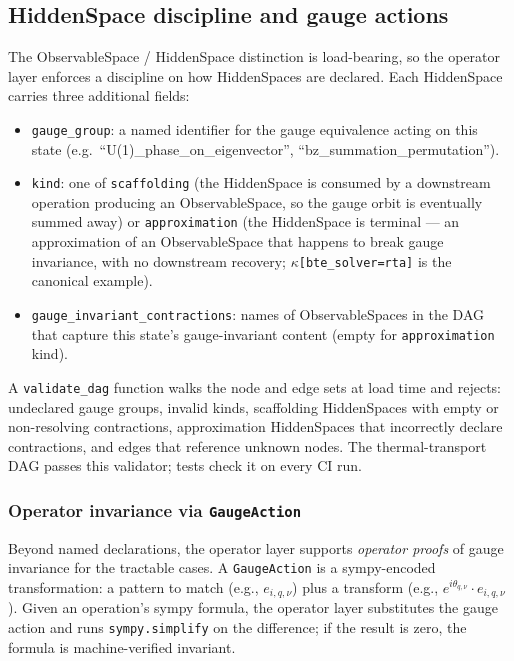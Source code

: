\documentclass[11pt,a4paper]{article}
\begin{document}
\subsection{HiddenSpace discipline and gauge actions}
\label{ssec:gauge-discipline}

The ObservableSpace / HiddenSpace distinction is load-bearing, so the operator layer
enforces a discipline on how HiddenSpaces are declared. Each HiddenSpace
carries three additional fields:

\begin{itemize}[leftmargin=2em, itemsep=0.2em]
  \item \texttt{gauge\_group}: a named identifier for the gauge equivalence
        acting on this state (e.g.\ ``U(1)\_phase\_on\_eigenvector'',
        ``bz\_summation\_permutation'').
  \item \texttt{kind}: one of \texttt{scaffolding} (the HiddenSpace is
        consumed by a downstream operation producing an ObservableSpace, so the
        gauge orbit is eventually summed away) or \texttt{approximation}
        (the HiddenSpace is terminal --- an approximation of an ObservableSpace
        that happens to break gauge invariance, with no downstream recovery;
        $\kappa$\texttt{[bte\_solver=rta]} is the canonical example).
  \item \texttt{gauge\_invariant\_contractions}: names of ObservableSpaces in the
        DAG that capture this state's gauge-invariant content (empty for
        \texttt{approximation} kind).
\end{itemize}

A \texttt{validate\_dag} function walks the node and edge sets at
load time and rejects: undeclared gauge groups, invalid kinds, scaffolding
HiddenSpaces with empty or non-resolving contractions, approximation
HiddenSpaces that incorrectly declare contractions, and edges that
reference unknown nodes. The thermal-transport DAG passes this
validator; tests check it on every CI run.

\subsubsection*{Operator invariance via \texttt{GaugeAction}}

Beyond named declarations, the operator layer supports \emph{operator proofs}
of gauge invariance for the tractable cases. A \texttt{GaugeAction} is a
sympy-encoded transformation: a pattern to match (e.g., $e_{i, q, \nu}$)
plus a transform (e.g., $e^{i\theta_{q,\nu}} \cdot e_{i, q, \nu}$). Given
an operation's sympy formula, the operator layer substitutes the gauge action
and runs \texttt{sympy.simplify} on the difference; if the result is zero,
the formula is machine-verified invariant.
\end{document}
